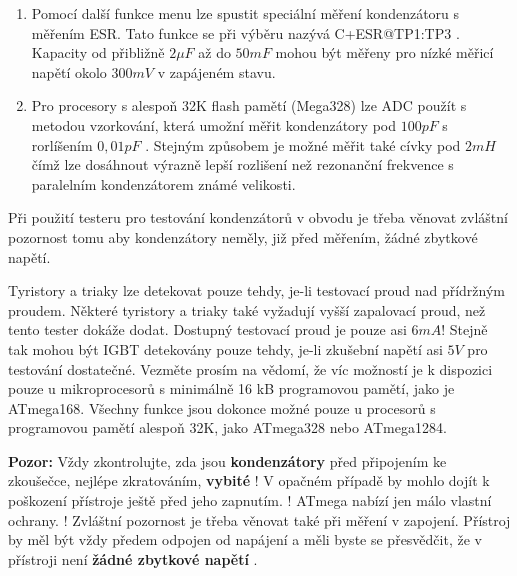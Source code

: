 \begin{enumerate}
\item Pomocí další funkce menu lze spustit speciální měření kondenzátoru s měřením ESR.
Tato funkce se při výběru nazývá \mbox{C+ESR@TP1:TP3} .
 Kapacity od přibližně \(2\mu F\) až do \(50mF\) mohou být měřeny pro nízké měřicí napětí okolo \(300mV\)
 v zapájeném stavu.
\item Pro procesory s alespoň 32K flash pamětí (Mega328) lze ADC použít s metodou vzorkování,
která umožní měřit kondenzátory pod \(100pF\) s rorlíšením  \(0,01pF\) .
Stejným způsobem je možné měřit také cívky pod \(2mH\) čímž lze dosáhnout výrazně lepší rozlišení
než rezonanční frekvence s paralelním kondenzátorem známé velikosti.
\end{enumerate}

 Při použití testeru pro testování kondenzátorů v obvodu je třeba věnovat zvláštní pozornost tomu
  aby kondenzátory neměly, již před měřením, žádné zbytkové napětí.

Tyristory a triaky lze detekovat pouze tehdy, je-li testovací proud nad přídržným proudem.
Některé tyristory a triaky také vyžadují vyšší zapalovací proud, než tento tester dokáže dodat.
Dostupný testovací proud je pouze asi \(6mA\)!
Stejně tak mohou být IGBT detekovány pouze tehdy, je-li zkušební napětí asi \(5V\) pro testování dostatečné.
Vezměte prosím na vědomí, že víc možností je k dispozici pouze u mikroprocesorů s minimálně 16 kB programovou pamětí, jako je ATmega168. 
Všechny funkce jsou dokonce možné pouze u procesorů s programovou pamětí alespoň 32K, jako ATmega328 nebo ATmega1284.

\vspace{1cm}
{\textbf{\Large Pozor:}} Vždy zkontrolujte, zda jsou \textbf{kondenzátory}  před připojením ke zkoušečce,
nejlépe zkratováním, \textbf{vybité} !
V opačném případě by mohlo dojít k poškození přístroje ještě před jeho zapnutím.
! ATmega nabízí jen málo vlastní ochrany. !
Zvláštní pozornost je třeba věnovat také při měření v zapojení.
Přístroj by měl být vždy předem odpojen od napájení a měli byste se přesvědčit, že v přístroji není \textbf {žádné zbytkové napětí} .
